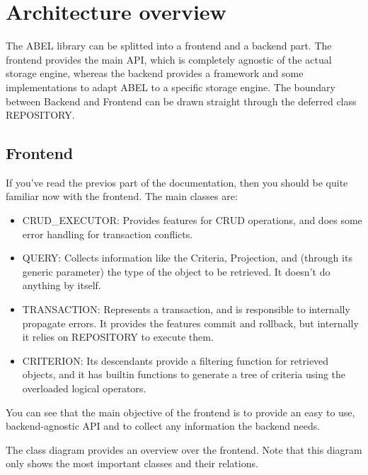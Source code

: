 \section{Architecture overview}

The ABEL library can be splitted into a frontend and a backend part.
The frontend provides the main API, which is completely agnostic of the actual storage engine, 
whereas the backend provides a framework and some implementations to adapt ABEL to a specific storage engine.
The boundary between Backend and Frontend can be drawn straight through the deferred class REPOSITORY.

\subsection{Frontend}

If you've read the previos part of the documentation, then you should be quite familiar now with the frontend.
The main classes are:
 \begin{itemize}
  \item CRUD\_EXECUTOR: Provides features for CRUD operations, and does some error handling for transaction conflicts.
  \item QUERY: Collects information like the Criteria, Projection, and (through its generic parameter) the type of the object to be retrieved. It doesn't do anything by itself.
  \item TRANSACTION: Represents a transaction, and is responsible to internally propagate errors. It provides the features commit and rollback, but internally it relies on REPOSITORY to execute them.
  \item CRITERION: Its descendants provide a filtering function for retrieved objects, and it has builtin functions to generate a tree of criteria using the overloaded logical operators.
 \end{itemize}

You can see that the main objective of the frontend is to provide an easy to use, backend-agnostic API and to collect any information the backend needs.

The class diagram provides an overview over the frontend.
Note that this diagram only shows the most important classes and their relations.

